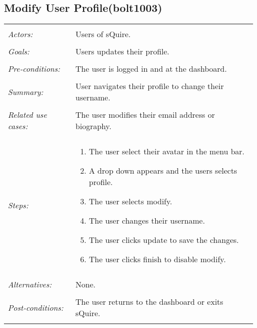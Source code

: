 \subsection{Modify User Profile(bolt1003)}
\begin{tabular}{ p{2cm} p{12cm} }
 \hline
 \\
 \textit{Actors:} & Users of sQuire. \\ 
 \\
 \textit{Goals:} & Users updates their profile. \\
 \\
 \textit{Pre-conditions:} & The user is logged in and at the dashboard. \\
 \\
 \textit{Summary:} & User navigates their profile to change their username.\\ 
 \\
 \textit{Related use cases:} & The user modifies their email address or biography. \\ 
 \\
 \textit{Steps:} & \begin{enumerate}
  \item The user select their avatar in the menu bar.
  \item A drop down appears and the users selects profile.
  \item The user selects modify. 
  \item The user changes their username.
  \item The user clicks update to save the changes.
  \item The user clicks finish to disable modify.
 \end{enumerate} \\
 \\
 \textit{Alternatives:} & None. \\
 \\
 \textit{Post-conditions:} & The user returns to the dashboard or exits sQuire. \\
 \\
\hline
\end{tabular}
